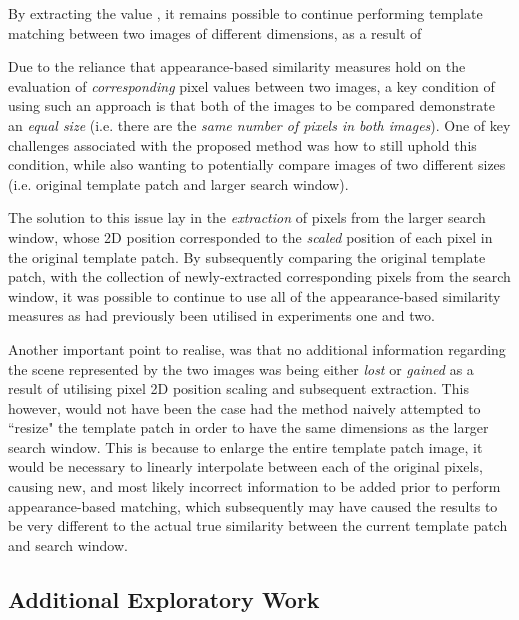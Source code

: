 By extracting the value , it remains possible to continue performing template matching between two images of different dimensions, as a result of

Due to the reliance that appearance-based similarity measures hold on the evaluation of \textit{corresponding} pixel values between two images, a key condition of using such an approach is that both of the images to be compared demonstrate an \textit{equal size} (i.e. there are the \textit{same number of pixels in both images}). One of key challenges associated with the proposed method was how to still uphold this condition, while also wanting to potentially compare images of two different sizes (i.e. original template patch and larger search window). 

The solution to this issue lay in the \textit{extraction} of pixels from the larger search window, whose 2D position corresponded to the \textit{scaled} position of each pixel in the original template patch. By subsequently comparing the original template patch, with the collection of newly-extracted corresponding pixels from the search window, it was possible to continue to use all of the appearance-based similarity measures as had previously been utilised in experiments one and two. 

Another important point to realise, was that no additional information regarding the scene represented by the two images was being either \textit{lost} or \textit{gained} as a result of utilising pixel 2D position scaling and subsequent extraction. This however, would not have been the case had the method naively attempted to ``resize" the template patch in order to have the same dimensions as the larger search window. This is because to enlarge the entire template patch image, it would be necessary to linearly interpolate between each of the original pixels, causing new, and most likely incorrect information to be added prior to perform appearance-based matching, which subsequently may have caused the results to be very different to the actual true similarity between the current template patch and search window.

\subsection{Additional Exploratory Work}





